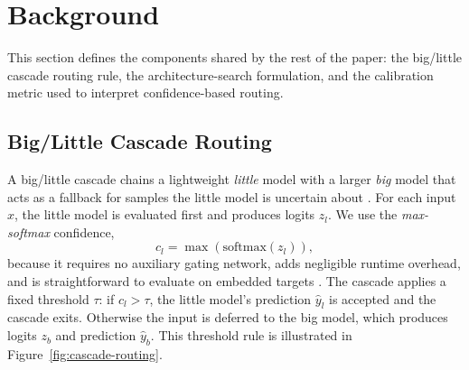 \documentclass[conference]{IEEEtran}
\begin{document}
\section{Background}
\label{sec:background}

This section defines the components shared by the rest of the paper: the
big/little cascade routing rule, the architecture-search formulation, and the
calibration metric used to interpret confidence-based routing.

\subsection{Big/Little Cascade Routing}
\label{sec:background:routing}

A big/little cascade chains a lightweight \emph{little} model with a larger
\emph{big} model that acts as a fallback for samples the little model is
uncertain about \cite{park2015biglittle}. For each input $x$, the little model
is evaluated first and produces logits $z_l$. We use the \emph{max-softmax}
confidence,
\begin{equation}
c_l = \max(\mathrm{softmax}(z_l)),
\label{eq:max-softmax}
\end{equation}
because it requires no auxiliary gating network, adds negligible runtime
overhead, and is straightforward to evaluate on embedded targets
\cite{guo2017calibration,teerapittayanon2017branchynet}. The cascade applies
a fixed threshold $\tau$: if $c_l > \tau$, the little model's prediction
$\hat{y}_l$ is accepted and the cascade exits. Otherwise the input is
deferred to the big model, which produces logits $z_b$ and prediction $\hat{y}_b$. This
threshold rule is illustrated in Figure~\ref{fig:cascade-routing}.
\end{document}
